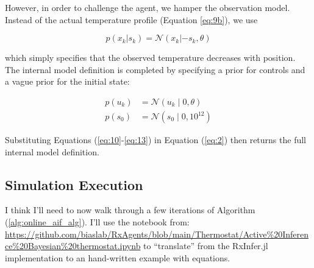 \documentclass{article}
\begin{document}
However, in order to challenge the agent, we hamper the observation model. Instead of the actual temperature profile (Equation \ref{eq:9b}), we use

\begin{equation}\label{eq:12}
p(x_k | s_k) = \mathcal{N}(x_k | -s_k, \theta)
\end{equation}

which simply specifies that the observed temperature decreases with position. The internal model definition is completed by specifying a prior for controls and a vague prior for the initial state:

\begin{subequations}\label{eq:13}
\begin{align}
p(u_k) &= \mathcal{N}(u_k \mid 0, \theta)\label{eq:13a} \\
p(s_0) &= \mathcal{N}(s_0 \mid 0, 10^{12})\label{eq:13b}
\end{align}
\end{subequations}

Substituting Equations (\ref{eq:10}-\ref{eq:13}) in Equation (\ref{eq:2}) then returns the full internal model definition.


\subsection{Simulation Execution}

I think I'll need to now walk through a few iterations of Algorithm (\ref{alg:online_aif_alg}). I'll use the notebook from: \url{https://github.com/biaslab/RxAgents/blob/main/Thermostat/Active%20Inference%20Bayesian%20thermostat.ipynb}
to ``translate'' from the RxInfer.jl implementation to an hand-written example with equations.
\end{document}

